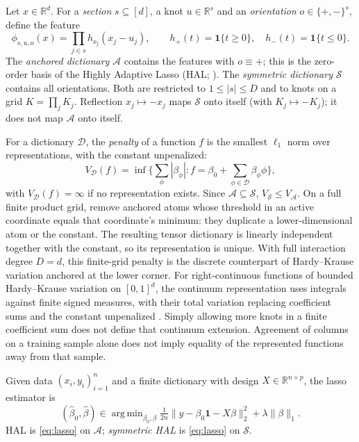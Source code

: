 \documentclass[11pt]{article}
\theoremstyle{definition}
\theoremstyle{remark}
\newcommand{\one}{\mathbf{1}}
\newcommand{\R}{\mathbb{R}}
\DeclareMathOperator*{\argmin}{arg\,min}
\begin{document}
Let $x \in \R^d$. For a \emph{section} $s \subseteq [d]$, a knot
$u \in \R^{s}$ and an \emph{orientation} $o \in \{+,-\}^{s}$, define the
feature
\[
  \phi_{s,u,o}(x) = \prod_{j \in s} h_{o_j}(x_j - u_j), \qquad
  h_+(t) = \one\{t \ge 0\}, \quad h_-(t) = \one\{t \le 0\}.
\]
The \emph{anchored dictionary} $\mathcal{A}$ contains the features with
$o \equiv +$; this is the zero-order basis of the Highly Adaptive Lasso
(HAL; \citealp{vanderlaan2017,benkeser2016}). The \emph{symmetric dictionary}
$\mathcal{S}$ contains all orientations. Both are restricted to
$1 \le |s| \le D$ and to knots on a grid $K = \prod_j K_j$.
Reflection $x_j \mapsto -x_j$ maps $\mathcal{S}$ onto itself (with
$K_j \mapsto -K_j$); it does not map $\mathcal{A}$ onto itself.

For a dictionary $\mathcal{D}$, the \emph{penalty} of a function $f$ is the
smallest $\ell_1$ norm over representations, with the constant unpenalized:
\[
  V_{\mathcal{D}}(f) = \inf\Big\{ \textstyle\sum_{\phi} |\beta_\phi| :
  f = \beta_0 + \sum_{\phi \in \mathcal{D}} \beta_\phi \phi \Big\},
\]
with $V_{\mathcal{D}}(f) = \infty$ if no representation exists. Since
$\mathcal{A} \subseteq \mathcal{S}$, $V_{\mathcal{S}} \le V_{\mathcal{A}}$.
On a full finite product grid, remove anchored atoms whose threshold in
an active coordinate equals that coordinate's minimum: they duplicate a
lower-dimensional atom or the constant. The resulting tensor dictionary
is linearly independent together with the constant, so its representation
is unique. With full interaction degree $D=d$, this finite-grid penalty is
the discrete counterpart of Hardy--Krause variation anchored at the lower
corner. For right-continuous functions of bounded Hardy--Krause variation
on $[0,1]^d$, the continuum representation uses integrals against finite
signed measures, with their total variation
replacing coefficient sums and the constant unpenalized
\citep{aistleitner2015,fang2021}. Simply allowing more knots in a finite
coefficient sum does not define that continuum extension. Agreement of columns
on a training sample alone does not imply equality of the represented
functions away from that sample.

Given data $(x_i, y_i)_{i=1}^n$ and a finite dictionary with design
$X \in \R^{n \times p}$, the lasso estimator is
\begin{equation}\label{eq:lasso}
  (\hat\beta_0, \hat\beta) \in \argmin_{\beta_0,\beta}
  \tfrac{1}{2n}\|y - \beta_0\one - X\beta\|_2^2 + \lambda \|\beta\|_1 .
\end{equation}
HAL is \eqref{eq:lasso} on $\mathcal{A}$; \emph{symmetric HAL} is
\eqref{eq:lasso} on $\mathcal{S}$.
\end{document}
